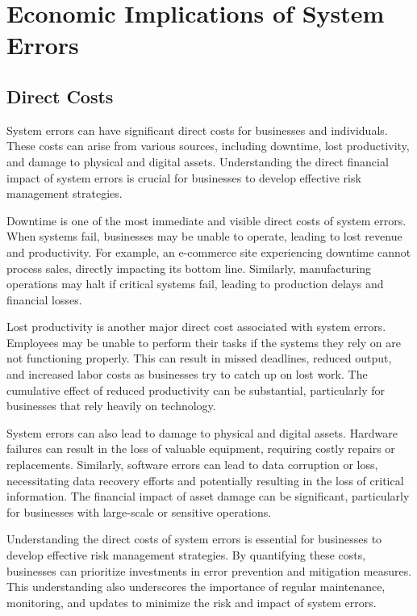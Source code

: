 \documentclass[10pt, conference, letterpaper]{IEEEtran}
\begin{document}
\section{Economic Implications of System Errors}
\subsection{Direct Costs}
System errors can have significant direct costs for businesses and individuals. These costs can arise from various sources, including downtime, lost productivity, and damage to physical and digital assets. Understanding the direct financial impact of system errors is crucial for businesses to develop effective risk management strategies.

Downtime is one of the most immediate and visible direct costs of system errors. When systems fail, businesses may be unable to operate, leading to lost revenue and productivity. For example, an e-commerce site experiencing downtime cannot process sales, directly impacting its bottom line. Similarly, manufacturing operations may halt if critical systems fail, leading to production delays and financial losses.

Lost productivity is another major direct cost associated with system errors. Employees may be unable to perform their tasks if the systems they rely on are not functioning properly. This can result in missed deadlines, reduced output, and increased labor costs as businesses try to catch up on lost work. The cumulative effect of reduced productivity can be substantial, particularly for businesses that rely heavily on technology.

System errors can also lead to damage to physical and digital assets. Hardware failures can result in the loss of valuable equipment, requiring costly repairs or replacements. Similarly, software errors can lead to data corruption or loss, necessitating data recovery efforts and potentially resulting in the loss of critical information. The financial impact of asset damage can be significant, particularly for businesses with large-scale or sensitive operations.

Understanding the direct costs of system errors is essential for businesses to develop effective risk management strategies. By quantifying these costs, businesses can prioritize investments in error prevention and mitigation measures. This understanding also underscores the importance of regular maintenance, monitoring, and updates to minimize the risk and impact of system errors.
\end{document}
